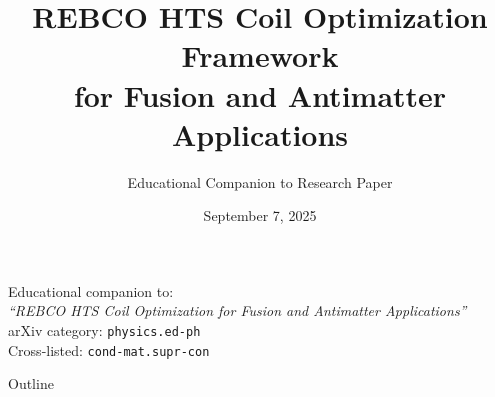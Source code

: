 \documentclass[aspectratio=169,xcolor={table,dvipsnames}]{beamer}
\title[REBCO HTS Coil Optimization]{REBCO HTS Coil Optimization Framework\\for Fusion and Antimatter Applications}
\subtitle{Educational Companion to Research Paper}
\author[\authorname]{\authorname}
\institute[Independent Researcher]{Independent Researcher}
\date{September 7, 2025}
\begin{document}
\begin{frame}
    \titlepage
    \begin{center}
        \small
        Educational companion to:\\
        \textit{``REBCO HTS Coil Optimization for Fusion and Antimatter Applications''}\\
        \vspace{0.3cm}
        arXiv category: \texttt{physics.ed-ph}\\
        Cross-listed: \texttt{cond-mat.supr-con}
    \end{center}
\end{frame}

\begin{frame}{Outline}
    \tableofcontents
\end{frame}
\end{document}
